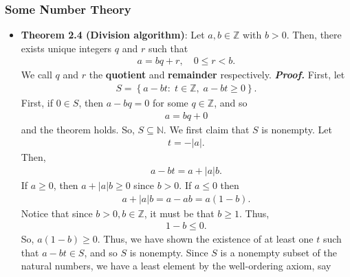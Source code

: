 \documentclass{report}
\begin{document}
    \subsubsection{Some Number Theory}
    \begin{itemize}
        \item \textbf{Theorem 2.4 (Division algorithm)}: Let $a,b \in \mathbb{Z}$ with $b > 0$. Then, there exists unique integers $q$ and $r$ such that 
            \begin{align*}
                a = bq + r, \quad 0 \leq r < b
            .\end{align*}
            We call $q$ and $r$ the \textbf{quotient} and \textbf{remainder} respectively.
            \bigbreak \noindent 
            \textbf{\textit{Proof.}} First, let 
            \begin{align*}
                S = \left\{a-bt:\; t \in \mathbb{Z},\; a-bt \geq 0\right\}
            .\end{align*}
            First, if $0 \in S$, then $a-bq  = 0$ for some $q \in \mathbb{Z}$, and so
            \begin{align*}
                a = bq + 0
            \end{align*}
            and the theorem holds. So, $S \subseteq \mathbb{N}$. We first claim that $S$ is nonempty. Let
            \begin{align*}
                t = -\left\lvert a \right\rvert
            .\end{align*}
            Then,
            \begin{align*}
                a - bt = a+\left\lvert a \right\rvert b
            .\end{align*}
            If $a \geq 0$, then $a + \left\lvert a \right\rvert b \geq 0$ since $b >0$. If $a \leq 0$ then
            \begin{align*}
                a + \left\lvert a \right\rvert b = a-ab = a(1-b)
            .\end{align*}
            Notice that since $b >0, b \in \mathbb{Z}$, it must be that $b \geq 1 $. Thus,
            \begin{align*}
                1-b \leq 0
            .\end{align*}
            So, $a(1-b) \geq 0$. Thus, we have shown the existence of at least one $t$ such that $a-bt \in S$, and so $S$ is nonempty.
            \bigbreak \noindent 
            Since $S$ is a nonempty subset of the natural numbers, we have a least element by the well-ordering axiom, say 

\end{itemize}
\end{document}
